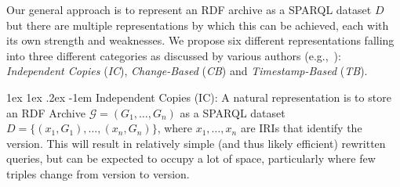 \documentclass{llncs}
\makeatletter
\renewcommand\paragraph{\@startsection{paragraph}{4}{\z@}%
	{1ex \@plus1ex \@minus.2ex}%
	{-1em}%
	{\normalfont\normalsize\itshape}}
\makeatother
\begin{document}
Our general approach is to represent an RDF archive as a SPARQL dataset $D$ but there are multiple representations by which this can be achieved, each with its own strength and weaknesses. We propose six different representations falling into three different categories as discussed by various authors (e.g.,~\cite{TzitzikasTA08,FernandezPU15}): \textit{Independent Copies} (\textit{IC}), \textit{Change-Based} (\textit{CB}) and \textit{Timestamp-Based} (\textit{TB}).

\newcommand{\ic}{\textsc{i}\xspace}
\newcommand{\cbpd}{\ensuremath{\textsc{c}_d^{+}}\xspace}
\newcommand{\cbpi}{\ensuremath{\textsc{c}_i^{+}}\xspace}
\newcommand{\cbmd}{\ensuremath{\textsc{c}_d^{-}}\xspace}
\newcommand{\cbmi}{\ensuremath{\textsc{c}_i^{-}}\xspace}
\newcommand{\cbi}{\ensuremath{\textsc{c}_i}\xspace}
\newcommand{\cbd}{\ensuremath{\textsc{c}_d}\xspace}
\newcommand{\cbp}{\ensuremath{\textsc{c}^{+}}\xspace}
\newcommand{\cbm}{\ensuremath{\textsc{c}^{-}}\xspace}
\newcommand{\tb}{\textsc{t}\xspace}

\paragraph{Independent Copies (IC):} A natural representation is to store an RDF Archive $\mathcal{G} = (G_1,\ldots,G_n)$ as a SPARQL dataset $D = \{ (x_1,G_1), \ldots, (x_n,G_n)\}$, where $x_1,\ldots,x_n$ are IRIs that identify the version. This will result in relatively simple (and thus likely efficient) rewritten queries, but can be expected to occupy a lot of space, particularly where few triples change from version to version. %
\end{document}
